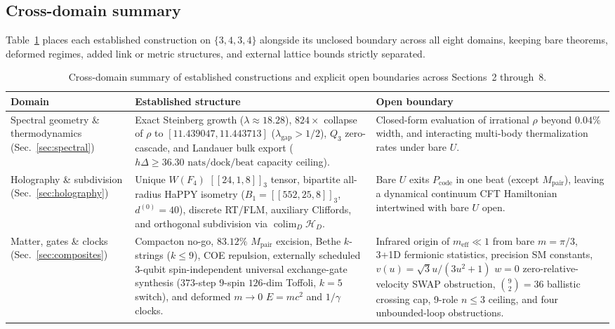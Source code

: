 \subsection{Cross-domain summary}

Table~\ref{tab:master-scorecard} places each established construction on $\{3,4,3,4\}$ alongside its unclosed boundary
across all eight domains, keeping bare theorems, deformed regimes, added link or metric structures, and external lattice
bounds strictly separated.

\begin{table}[tb]
\centering
\caption{Cross-domain summary of established constructions and explicit open boundaries across Sections~2 through~8.}
\label{tab:master-scorecard}
\footnotesize
\begin{tabularx}{\textwidth}{@{}>{\raggedright\arraybackslash}p{2.95cm}>{\raggedright\arraybackslash}X>{\raggedright\arraybackslash}p{5.85cm}@{}}
\toprule
Domain & Established structure & Open boundary \\
\midrule
Spectral geometry \& thermodynamics (Sec.~\ref{sec:spectral}) & Exact Steinberg growth ($\lambda \approx 18.28$), $824\times$ collapse of $\rho$ to $[11.439047, 11.443713]$ ($\lambda_{\mathrm{gap}} > 1/2$), $Q_3$ zero-cascade, and Landauer bulk export ($h\Delta \ge 36.30\text{ nats/dock/beat}$ capacity ceiling). & Closed-form evaluation of irrational $\rho$ beyond $0.04\%$ width, and interacting multi-body thermalization rates under bare $U$. \\
\addlinespace[2pt]
Holography \& subdivision (Sec.~\ref{sec:holography}) & Unique $W(F_4)$ $[[24, 1, 8]]_3$ tensor, bipartite all-radius HaPPY isometry ($B_1 = [[552, 25, 8]]_3$, $d^{(0)} = 40$), discrete RT/FLM, auxiliary Cliffords, and orthogonal subdivision via $\operatorname{colim}_D \mathcal{H}_D$. & Bare $U$ exits $P_{\mathrm{code}}$ in one beat (except $M_{\mathrm{pair}}$), leaving a dynamical continuum CFT Hamiltonian intertwined with bare $U$ open. \\
\addlinespace[2pt]
Matter, gates \& clocks (Sec.~\ref{sec:composites}) & Compacton no-go, $83.12\%$ $M_{\mathrm{pair}}$ excision, Bethe $k$-strings ($k \le 9$), COE repulsion, externally scheduled 3-qubit spin-independent universal exchange-gate synthesis ($373$-step $9$-spin $126$-dim Toffoli, $k = 5$ switch), and deformed $m \to 0$ $E = mc^2$ and $1/\gamma$ clocks. & Infrared origin of $m_{\mathrm{eff}} \ll 1$ from bare $m = \pi/3$, 3+1D fermionic statistics, precision SM constants, $v(u) = \sqrt{3}u/(3u^2+1)$ $w = 0$ zero-relative-velocity SWAP obstruction, $\binom{9}{2} = 36$ ballistic crossing cap, 9-role $n \le 3$ ceiling, and four unbounded-loop obstructions. \\

\end{tabularx}
\end{table}
